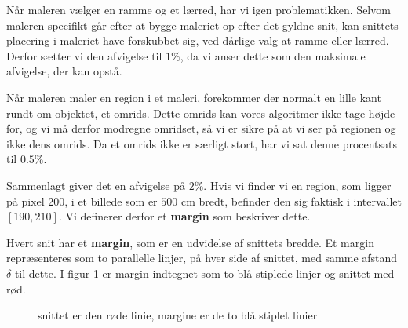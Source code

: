{Når maleren vælger en ramme og et lærred, har vi igen problematikken.
Selvom maleren specifikt går efter at bygge maleriet op efter det gyldne
snit, kan snittets placering i maleriet have forskubbet sig, ved dårlige
valg at ramme eller lærred. Derfor sætter vi den afvigelse til $1\%$, da
vi anser dette som den maksimale afvigelse, der kan opstå.

Når maleren maler en region i et maleri, forekommer der normalt en
lille kant rundt om objektet, et omrids. Dette omrids kan vores
algoritmer ikke tage højde for, og vi må derfor modregne omridset, så vi
er sikre på at vi ser på regionen og ikke dens omrids. Da et omrids ikke
er særligt stort, har vi sat denne procentsats til $0.5\%$.

Sammenlagt giver det en afvigelse på $2\%$. Hvis vi finder vi en region,
som ligger på pixel 200, i et billede som er $500$ cm bredt, befinder
den sig faktisk i intervallet $[190,210]$. Vi definerer derfor et
\textbf{margin} som beskriver dette.

\begin{definition}
    Hvert snit har et \textbf{margin}, som er en udvidelse af snittets
    bredde. Et margin repræsenteres som to parallelle linjer, på hver
    side af snittet, med samme afstand $\delta$ til dette.  I figur
    \ref{margin} er margin indtegnet som to blå stiplede linjer og
    snittet med rød.
\end{definition}

\begin{figure}[hb]
    \setlength\fboxsep{0pt}
    \setlength\fboxrule{0.5pt}
    \centering
    \caption[]{snittet er den røde linie, margine er de to blå stiplet linier}
    \label{margin}
\end{figure}

}

